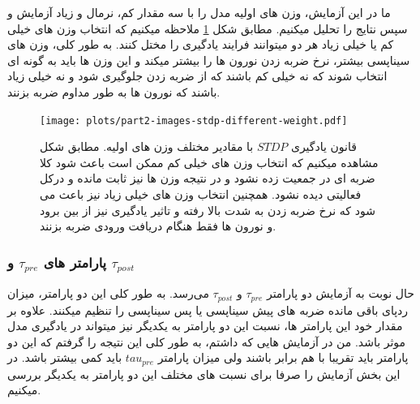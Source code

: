             ما در این آزمایش، وزن های اولیه مدل را با سه مقدار کم، نرمال و زیاد آزمایش و سپس نتایج را تحلیل میکنیم. مطابق شکل 
            \ref{fig:part2-images-stdp-different-weight}
            ملاحظه میکنیم که انتخاب وزن های خیلی کم یا خیلی زیاد هر دو میتوانند فرایند یادگیری را مختل کنند. به طور کلی، وزن های سیناپسی بیشتر، نرخ ضربه زدن نورون ها را بیشتر میکند و این وزن ها باید به گونه ای انتخاب شوند که نه خیلی کم باشند که از ضربه زدن جلوگیری شود و نه خیلی زیاد باشند که نورون ها به طور مداوم ضربه بزنند.
            \begin{figure}[htbp]
                \centering
                \texttt{[image: plots/part2-images-stdp-different-weight.pdf]} 
                \caption{قانون یادگیری 
                $STDP$ 
                با مقادیر مختلف وزن های اولیه.
                مطابق شکل مشاهده میکنیم که انتخاب وزن های خیلی کم ممکن است باعث شود کلا ضربه ای در جمعیت زده نشود و در نتیجه وزن ها نیز ثابت مانده و درکل فعالیتی دیده نشود. همچنین انتخاب وزن های خیلی زیاد نیز باعث می شود که نرخ ضربه زدن به شدت بالا رفته و تاثیر یادگیری نیز از بین برود و نورون ها فقط هنگام دریافت ورودی ضربه بزنند.
                }
                \label{fig:part2-images-stdp-different-weight}
            \end{figure}

        \subsubsection*{پارامتر های $\tau_{pre}$ و $\tau_{post}$}
            حال نوبت به آزمایش دو پارامتر 
            $\tau_{pre}$ و $\tau_{post}$ 
            می‌رسد. به طور کلی این دو پارامتر، میزان ردپای باقی مانده ضربه های پیش سیناپسی یا پس سیناپسی را تنظیم میکنند. علاوه بر مقدار خود این پارامتر ها، نسبت این دو پارامتر به یکدیگر نیز میتواند در یادگیری مدل موثر باشد. من در آزمایش هایی که داشتم، به طور کلی این نتیجه را گرفتم که این دو پارامتر باید تقریبا با هم برابر باشند ولی میزان پارامتر 
            $tau_{pre}$ 
            باید کمی بیشتر باشد.
            در این بخش آزمایش را صرفا برای نسبت های مختلف این دو پارامتر به یکدیگر بررسی میکنیم.

